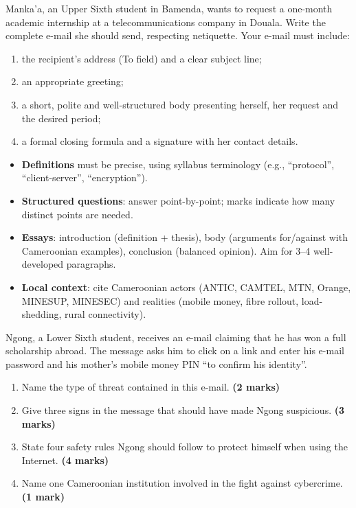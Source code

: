 \documentclass[11pt]{article}
\newcounter{popsec}
\newcounter{popsub}
\newcommand{\courssub}[1]{%
  \stepcounter{popsub}%
  \par\vspace{9pt}\noindent{\popxbold\fontsize{11.5}{13}\selectfont\color{popink}{\color{poporange}\thepopsec.\thepopsub}\hspace{6pt}#1}\par\nopagebreak\vspace{4pt}
}
\begin{document}
\begin{exercice}
Manka'a, an Upper Sixth student in Bamenda, wants to request a one-month academic internship at a telecommunications company in Douala. Write the complete e-mail she should send, respecting netiquette. Your e-mail must include:
\begin{enumerate}
\item the recipient's address (To field) and a clear subject line;
\item an appropriate greeting;
\item a short, polite and well-structured body presenting herself, her request and the desired period;
\item a formal closing formula and a signature with her contact details.
\end{enumerate}
\end{exercice}

\courssub{I prepare for the GCE}

\begin{aretenir}
\begin{itemize}
\item \textbf{Definitions} must be precise, using syllabus terminology (e.g., ``protocol'', ``client-server'', ``encryption'').
\item \textbf{Structured questions}: answer point-by-point; marks indicate how many distinct points are needed.
\item \textbf{Essays}: introduction (definition + thesis), body (arguments for/against with Cameroonian examples), conclusion (balanced opinion). Aim for 3--4 well-developed paragraphs.
\item \textbf{Local context}: cite Cameroonian actors (ANTIC, CAMTEL, MTN, Orange, MINESUP, MINESEC) and realities (mobile money, fibre rollout, load-shedding, rural connectivity).
\end{itemize}
\end{aretenir}

\begin{exercice}
Ngong, a Lower Sixth student, receives an e-mail claiming that he has won a full scholarship abroad. The message asks him to click on a link and enter his e-mail password and his mother's mobile money PIN ``to confirm his identity''.
\begin{enumerate}
\item Name the type of threat contained in this e-mail. \textbf{(2 marks)}
\item Give three signs in the message that should have made Ngong suspicious. \textbf{(3 marks)}
\item State four safety rules Ngong should follow to protect himself when using the Internet. \textbf{(4 marks)}
\item Name one Cameroonian institution involved in the fight against cybercrime. \textbf{(1 mark)}
\end{enumerate}
\end{exercice}
\end{document}
